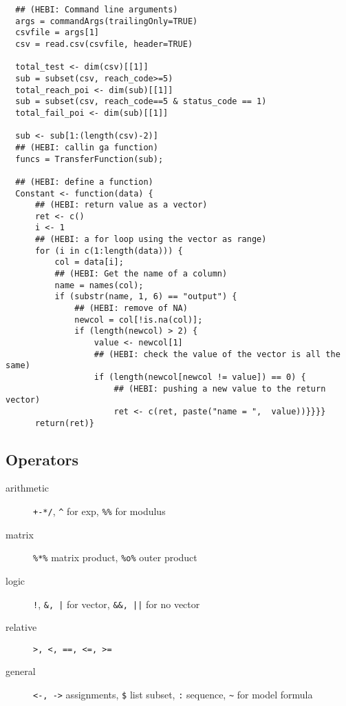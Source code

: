 \begin{lstlisting}
  ## (HEBI: Command line arguments)
  args = commandArgs(trailingOnly=TRUE)
  csvfile = args[1]
  csv = read.csv(csvfile, header=TRUE)

  total_test <- dim(csv)[[1]]
  sub = subset(csv, reach_code>=5)
  total_reach_poi <- dim(sub)[[1]]
  sub = subset(csv, reach_code==5 & status_code == 1)
  total_fail_poi <- dim(sub)[[1]]

  sub <- sub[1:(length(csv)-2)]
  ## (HEBI: callin ga function)
  funcs = TransferFunction(sub);

  ## (HEBI: define a function)
  Constant <- function(data) {
      ## (HEBI: return value as a vector)
      ret <- c()
      i <- 1
      ## (HEBI: a for loop using the vector as range)
      for (i in c(1:length(data))) {
          col = data[i];
          ## (HEBI: Get the name of a column)
          name = names(col);
          if (substr(name, 1, 6) == "output") {
              ## (HEBI: remove of NA)
              newcol = col[!is.na(col)];
              if (length(newcol) > 2) {
                  value <- newcol[1]
                  ## (HEBI: check the value of the vector is all the same)
                  if (length(newcol[newcol != value]) == 0) {
                      ## (HEBI: pushing a new value to the return vector)
                      ret <- c(ret, paste("name = ",  value))}}}}
      return(ret)}
\end{lstlisting}

\subsection{Operators}
\begin{description}
\item [arithmetic] \texttt{+-*/}, \verb$^$ for exp, \verb$%%$ for modulus
\item [matrix] \verb$%*%$ matrix product, \verb$%o%$ outer product
\item [logic] \verb$!$, \verb$&, |$ for vector, \verb$&&, ||$ for no vector
\item [relative] \verb$>, <, ==, <=, >=$
\item [general] \verb$<-, ->$ assignments, \texttt{\$} list subset,
  \verb$:$ sequence, \verb$~$ for model formula
\end{description}


